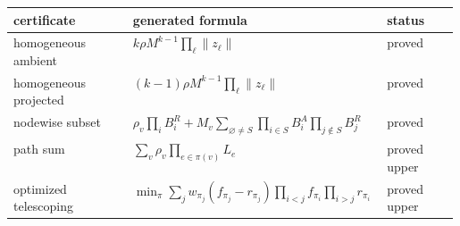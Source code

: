 \begin{tabular}{@{}lp{0.58\linewidth}l@{}}
\toprule
certificate & generated formula & status \\
\midrule
homogeneous ambient & $k\rho M^{k-1}\prod_\ell\lVert z_\ell\rVert$ & proved \\
homogeneous projected & $(k-1)\rho M^{k-1}\prod_\ell\lVert z_\ell\rVert$ & proved \\
nodewise subset & $\rho_v\prod_iB_i^R+M_v\sum_{\varnothing\ne S}\prod_{i\in S}B_i^A\prod_{j\notin S}B_j^R$ & proved \\
path sum & $\sum_v\rho_v\prod_{e\in\pi(v)}L_e$ & proved upper \\
optimized telescoping & $\min_\pi\sum_j w_{\pi_j}(f_{\pi_j}-r_{\pi_j})\prod_{i<j}f_{\pi_i}\prod_{i>j}r_{\pi_i}$ & proved upper \\
\bottomrule
\end{tabular}
